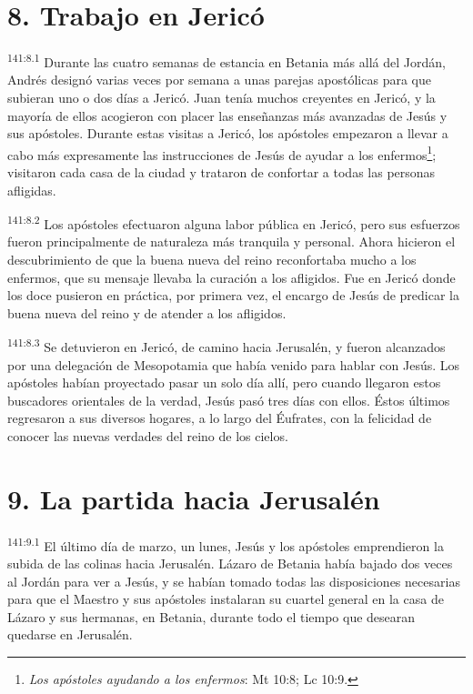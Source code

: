 \section*{8. Trabajo en Jericó}
\par
\textsuperscript{141:8.1} Durante las cuatro semanas de estancia en Betania más allá del Jordán, Andrés designó varias veces por semana a unas parejas apostólicas para que subieran uno o dos días a Jericó. Juan tenía muchos creyentes en Jericó, y la mayoría de ellos acogieron con placer las enseñanzas más avanzadas de Jesús y sus apóstoles. Durante estas visitas a Jericó, los apóstoles empezaron a llevar a cabo más expresamente las instrucciones de Jesús de ayudar a los enfermos\footnote{\textit{Los apóstoles ayudando a los enfermos}: Mt 10:8; Lc 10:9.}; visitaron cada casa de la ciudad y trataron de confortar a todas las personas afligidas.

\par
\textsuperscript{141:8.2} Los apóstoles efectuaron alguna labor pública en Jericó, pero sus esfuerzos fueron principalmente de naturaleza más tranquila y personal. Ahora hicieron el descubrimiento de que la buena nueva del reino reconfortaba mucho a los enfermos, que su mensaje llevaba la curación a los afligidos. Fue en Jericó donde los doce pusieron en práctica, por primera vez, el encargo de Jesús de predicar la buena nueva del reino y de atender a los afligidos.

\par
\textsuperscript{141:8.3} Se detuvieron en Jericó, de camino hacia Jerusalén, y fueron alcanzados por una delegación de Mesopotamia que había venido para hablar con Jesús. Los apóstoles habían proyectado pasar un solo día allí, pero cuando llegaron estos buscadores orientales de la verdad, Jesús pasó tres días con ellos. Éstos últimos regresaron a sus diversos hogares, a lo largo del Éufrates, con la felicidad de conocer las nuevas verdades del reino de los cielos.

\section*{9. La partida hacia Jerusalén}
\par
\textsuperscript{141:9.1} El último día de marzo, un lunes, Jesús y los apóstoles emprendieron la subida de las colinas hacia Jerusalén. Lázaro de Betania había bajado dos veces al Jordán para ver a Jesús, y se habían tomado todas las disposiciones necesarias para que el Maestro y sus apóstoles instalaran su cuartel general en la casa de Lázaro y sus hermanas, en Betania, durante todo el tiempo que desearan quedarse en Jerusalén.

